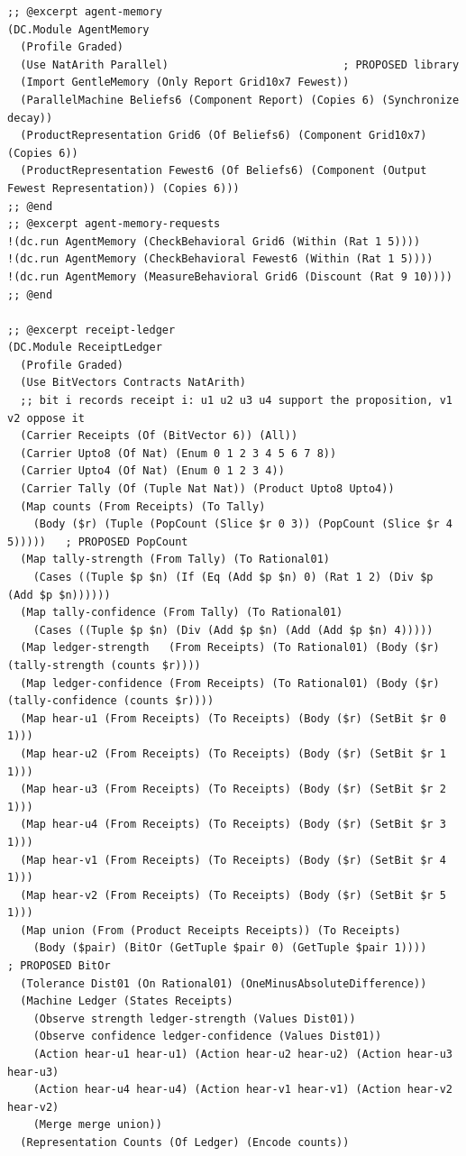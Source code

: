 \documentclass[11pt]{article}
\theoremstyle{definition}
\theoremstyle{plain}
\begin{document}
\begin{lstlisting}[style=mettafull]
;; @excerpt agent-memory
(DC.Module AgentMemory
  (Profile Graded)
  (Use NatArith Parallel)                           ; PROPOSED library
  (Import GentleMemory (Only Report Grid10x7 Fewest))
  (ParallelMachine Beliefs6 (Component Report) (Copies 6) (Synchronize decay))
  (ProductRepresentation Grid6 (Of Beliefs6) (Component Grid10x7) (Copies 6))
  (ProductRepresentation Fewest6 (Of Beliefs6) (Component (Output Fewest Representation)) (Copies 6)))
;; @end
;; @excerpt agent-memory-requests
!(dc.run AgentMemory (CheckBehavioral Grid6 (Within (Rat 1 5))))
!(dc.run AgentMemory (CheckBehavioral Fewest6 (Within (Rat 1 5))))
!(dc.run AgentMemory (MeasureBehavioral Grid6 (Discount (Rat 9 10))))
;; @end

;; @excerpt receipt-ledger
(DC.Module ReceiptLedger
  (Profile Graded)
  (Use BitVectors Contracts NatArith)
  ;; bit i records receipt i: u1 u2 u3 u4 support the proposition, v1 v2 oppose it
  (Carrier Receipts (Of (BitVector 6)) (All))
  (Carrier Upto8 (Of Nat) (Enum 0 1 2 3 4 5 6 7 8))
  (Carrier Upto4 (Of Nat) (Enum 0 1 2 3 4))
  (Carrier Tally (Of (Tuple Nat Nat)) (Product Upto8 Upto4))
  (Map counts (From Receipts) (To Tally)
    (Body ($r) (Tuple (PopCount (Slice $r 0 3)) (PopCount (Slice $r 4 5)))))   ; PROPOSED PopCount
  (Map tally-strength (From Tally) (To Rational01)
    (Cases ((Tuple $p $n) (If (Eq (Add $p $n) 0) (Rat 1 2) (Div $p (Add $p $n))))))
  (Map tally-confidence (From Tally) (To Rational01)
    (Cases ((Tuple $p $n) (Div (Add $p $n) (Add (Add $p $n) 4)))))
  (Map ledger-strength   (From Receipts) (To Rational01) (Body ($r) (tally-strength (counts $r))))
  (Map ledger-confidence (From Receipts) (To Rational01) (Body ($r) (tally-confidence (counts $r))))
  (Map hear-u1 (From Receipts) (To Receipts) (Body ($r) (SetBit $r 0 1)))
  (Map hear-u2 (From Receipts) (To Receipts) (Body ($r) (SetBit $r 1 1)))
  (Map hear-u3 (From Receipts) (To Receipts) (Body ($r) (SetBit $r 2 1)))
  (Map hear-u4 (From Receipts) (To Receipts) (Body ($r) (SetBit $r 3 1)))
  (Map hear-v1 (From Receipts) (To Receipts) (Body ($r) (SetBit $r 4 1)))
  (Map hear-v2 (From Receipts) (To Receipts) (Body ($r) (SetBit $r 5 1)))
  (Map union (From (Product Receipts Receipts)) (To Receipts)
    (Body ($pair) (BitOr (GetTuple $pair 0) (GetTuple $pair 1))))               ; PROPOSED BitOr
  (Tolerance Dist01 (On Rational01) (OneMinusAbsoluteDifference))
  (Machine Ledger (States Receipts)
    (Observe strength ledger-strength (Values Dist01))
    (Observe confidence ledger-confidence (Values Dist01))
    (Action hear-u1 hear-u1) (Action hear-u2 hear-u2) (Action hear-u3 hear-u3)
    (Action hear-u4 hear-u4) (Action hear-v1 hear-v1) (Action hear-v2 hear-v2)
    (Merge merge union))
  (Representation Counts (Of Ledger) (Encode counts))


\end{lstlisting}
\end{document}
